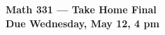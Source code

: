 \documentclass[12pt]{amsart}
\begin{document}
\begin{center}
{\bf Math 331 --- Take Home Final \\
Due Wednesday, May 12, 4 pm}
\end{center}

\bigskip

%
%
%
%
%
%
%
%
%
%
%
\end{document}
